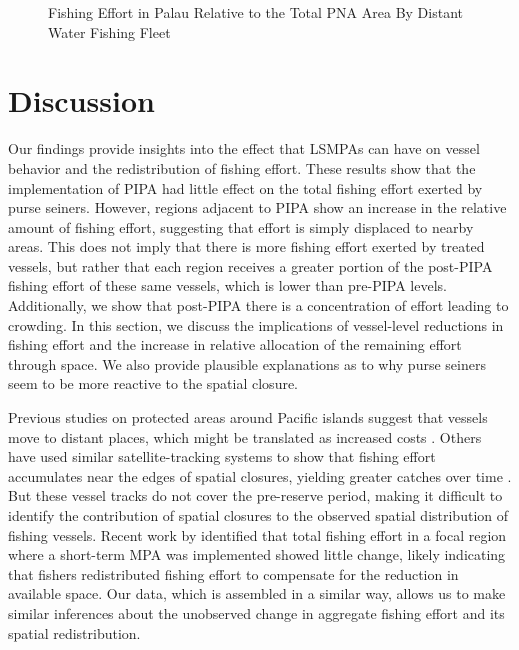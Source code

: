 \documentclass[11pt,english]{article}
\begin{document}
\begin{figure}[h]
	\caption{Fishing Effort in Palau Relative to the Total PNA Area By Distant Water Fishing Fleet}
\end{figure}


\clearpage


\section{Discussion}\label{discussion}

Our findings provide insights into the effect that LSMPAs
can have on vessel behavior and the redistribution of fishing effort.
These results show that the implementation of PIPA had
little effect on the total fishing effort exerted by purse seiners. However, regions
adjacent to PIPA show an increase in the relative amount of fishing
effort, suggesting that effort is simply displaced to nearby areas.
This does not imply that there is more fishing effort exerted by treated
vessels, but rather that each region receives a greater portion of the
post-PIPA fishing effort of these same vessels, which is lower than
pre-PIPA levels. Additionally, we show that post-PIPA there is a
concentration of effort leading to crowding. In this section, we discuss
the implications of vessel-level reductions in fishing effort and the
increase in relative allocation of the remaining effort through space.
We also provide plausible explanations as to why purse seiners seem to
be more reactive to the spatial closure.

Previous studies on protected areas around Pacific islands suggest that vessels move to
distant places, which might be translated as increased costs
\citep{stevenson_2013}. Others have used similar satellite-tracking systems to
show that fishing effort accumulates near the edges of spatial closures,
yielding greater catches over time \citep{murawski_2005}. But these vessel tracks
do not cover the pre-reserve period, making it difficult to identify the
contribution of spatial closures to the observed spatial distribution of
fishing vessels. Recent work by \citet{elahi_2018} identified that total
fishing effort in a focal region where a short-term MPA was implemented
showed little change, likely indicating that fishers redistributed
fishing effort to compensate for the reduction in available space. Our
data, which is assembled in a similar way, allows us to make similar
inferences about the unobserved change in aggregate fishing effort and
its spatial redistribution.
\end{document}
